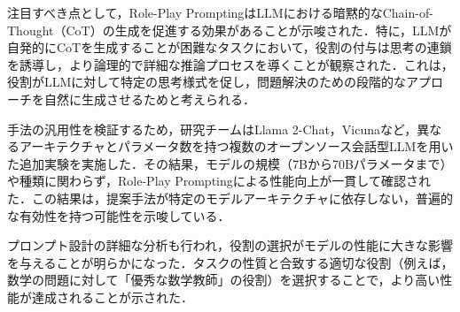 \documentclass[11pt]{jreport}
\begin{document}
注目すべき点として，Role-Play PromptingはLLMにおける暗黙的なChain-of-Thought（CoT）の生成を促進する効果があることが示唆された．特に，LLMが自発的にCoTを生成することが困難なタスクにおいて，役割の付与は思考の連鎖を誘導し，より論理的で詳細な推論プロセスを導くことが観察された．これは，役割がLLMに対して特定の思考様式を促し，問題解決のための段階的なアプローチを自然に生成させるためと考えられる．

手法の汎用性を検証するため，研究チームはLlama 2-Chat，Vicunaなど，異なるアーキテクチャとパラメータ数を持つ複数のオープンソース会話型LLMを用いた追加実験を実施した．その結果，モデルの規模（7Bから70Bパラメータまで）や種類に関わらず，Role-Play Promptingによる性能向上が一貫して確認された．この結果は，提案手法が特定のモデルアーキテクチャに依存しない，普遍的な有効性を持つ可能性を示唆している．

プロンプト設計の詳細な分析も行われ，役割の選択がモデルの性能に大きな影響を与えることが明らかになった．タスクの性質と合致する適切な役割（例えば，数学の問題に対して「優秀な数学教師」の役割）を選択することで，より高い性能が達成されることが示された．
\end{document}

